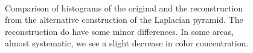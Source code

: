 \documentclass[a4paper, 10pt, final]{article}
\begin{document}
\begin{figure}[!h]
    \centering
    \hspace{1em}
    \\
    \caption{Comparison of histograms of the original and the
    reconstruction from the alternative construction of the Laplacian
    pyramid. The reconstruction do have some minor differences. In some
    areas, almost systematic, we see a slight decrease in color concentration.}
    \label{alt_comparison}
\end{figure}
\end{document}
